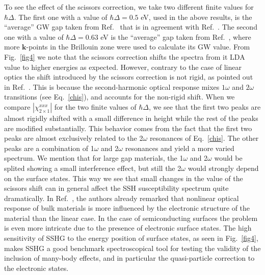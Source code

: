 \documentclass[floatfix,prb,aps,superscriptaddress,showpacs,11pt,preprint,letterpaper]{revtex4}
\begin{document}
To see the effect of the scissors correction, we take two different
finite values for $\hbar\Delta$. The first one
with a value of $\hbar\Delta=0.5$ eV, used in the above results, 
is the ``average'' GW gap taken from 
Ref.~ 
that is in agreement with Ref.~. The second one
with a value of $\hbar\Delta=0.63$ eV is the ``average'' 
gap taken from Ref.~, 
where more $\mathbf{k}$-points in the Brillouin zone were 
used to calculate its GW value.
From Fig.~\ref{fig4}
we note that the scissors correction 
shifts the spectra from it LDA value to higher energies as expected.
 However, contrary 
to the case of linear optics\cite{cabellosPRB09} the shift introduced 
by the scissors correction is not 
rigid, as pointed out in Ref.~. 
 This is because the second-harmonic optical response mixes 
$1\omega$ and $2\omega$ transitions (see Eq.~\eqref{chis}), and accounts 
for the non-rigid shift. 
When we compare 
$|\chi^{xxx}_{2\times 1}|$ for the two finite values of $\hbar\Delta$,
we see that the first two peaks are almost rigidly 
shifted with a small difference in height while
the rest of the peaks are modified substantially. 
This behavior comes from the fact that the first two
peaks are almost exclusively related to the 
2$\omega$ resonances of
Eq.~\eqref{chis}. The other peaks are a combination 
of 1$\omega$ and 2$\omega$ resonances 
and yield a more varied spectrum.
We mention that for large gap materials, the 1$\omega$ and 2$\omega$ would be splited
showing a small interference effect, but still the 2$\omega$ would
strongly depend on the surface states.
 This way we see that small changes in the value of the 
scissors shift can in general affect the SSH susceptibility 
spectrum quite dramatically.
In Ref.~, the authors already remarked
that nonlinear optical response of bulk materials
is more influenced by the electronic structure
of the material than the linear case. 
In the case of semiconducting surfaces the
problem is even more intricate due to the presence of electronic
surface states.
The high sensitivity of SSHG to the energy position  of surface
states, as seen in Fig.~\ref{fig4}, makes SSHG a good benchmark
spectroscopical tool for testing the validity of the inclusion of many-body effects,
and in particular the quasi-particle correction to the electronic states. 
\end{document}
